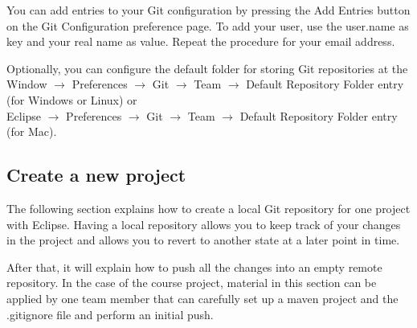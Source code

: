 \documentclass{article}
\begin{document}
You can add entries to your Git configuration by pressing the Add
Entries button on the Git Configuration preference page. To add your
user, use the user.name as key and your real name as value. Repeat the
procedure for your email address. 

Optionally, you can configure the default folder for storing Git
repositories at the\\ 
Window $\rightarrow$ Preferences $\rightarrow$ Git $\rightarrow$ Team
$\rightarrow$ Default Repository Folder entry (for Windows or Linux) or\\
Eclipse $\rightarrow$ Preferences $\rightarrow$ Git $\rightarrow$ Team
$\rightarrow$ Default  Repository Folder entry (for Mac). 



\subsection{Create a new project}

The following section explains how to create a local Git repository
for one project with Eclipse. Having a local repository allows you to keep track of your
changes in the project and allows you to revert to another state at a
later point in time.
 
After that, it will explain how to push all the changes into an empty
remote repository. In the case of the course project, material in this
section can be applied by one team member that can carefully set up a
maven project and the .gitignore file and perform an initial push.
\end{document}
